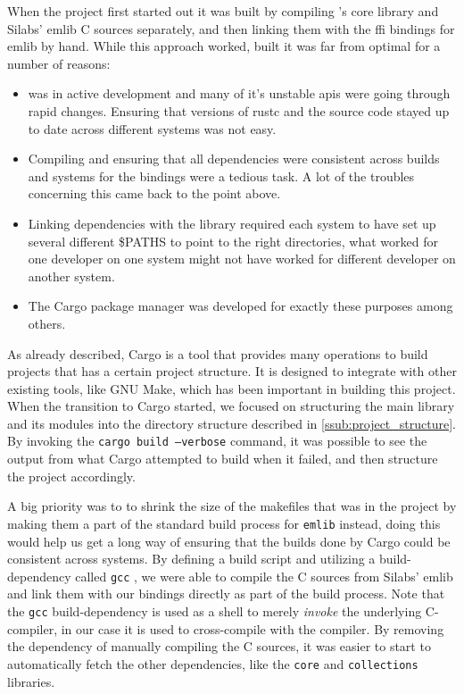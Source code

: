 When the project first started out it was built by compiling \rust's core library and Silabs' emlib C sources separately, and then linking them with the \gls{ffi} bindings for emlib by hand.
While this approach worked, built it was far from optimal for a number of reasons:

\begin{itemize}
    \item \rust was in active development and many of it's unstable \glspl{api} were going through rapid changes. Ensuring that versions of rustc and the \rust source code stayed up to date across different systems was not easy.
    \item Compiling and ensuring that all dependencies were consistent across builds and systems for the bindings were a tedious task. A lot of the troubles concerning this came back to the point above.
    \item Linking dependencies with the library required each system to have set up several different \$PATHS to point to the right directories, what worked for one developer on one system might not have worked for different developer on another system.
    \item The Cargo package manager was developed for exactly these purposes among others.
\end{itemize}

As already described, Cargo is a tool that provides many operations to build \rust projects that has a certain project structure.
It is designed to integrate with other existing tools, like GNU Make, which has been important in  building this project.
When the transition to Cargo started, we focused on structuring the main library and its modules into the directory structure described in \autoref{ssub:project_structure}.
By invoking the \texttt{cargo build --verbose} command, it was possible to see the output from what Cargo attempted to build when it failed, and then structure the project accordingly.

A big priority was to to shrink the size of the makefiles that was in the project by making them a part of the standard build process for \texttt{emlib} instead, doing this would help us get a long way of ensuring that the builds done by Cargo could be consistent across systems.
By defining a \rust build script and utilizing a \rust build-dependency called \texttt{gcc} \cite{web:cargo_gcc}, we were able to compile the C sources from Silabs' emlib and link them with our bindings directly as part of the build process.
Note that the \texttt{gcc} build-dependency is used as a shell to merely \emph{invoke} the underlying C-compiler, in our case it is used to cross-compile with the \armgcc compiler.
By removing the dependency of manually compiling the C sources, it was easier to start to automatically fetch the other dependencies, like the \texttt{core} and \texttt{collections} libraries.

